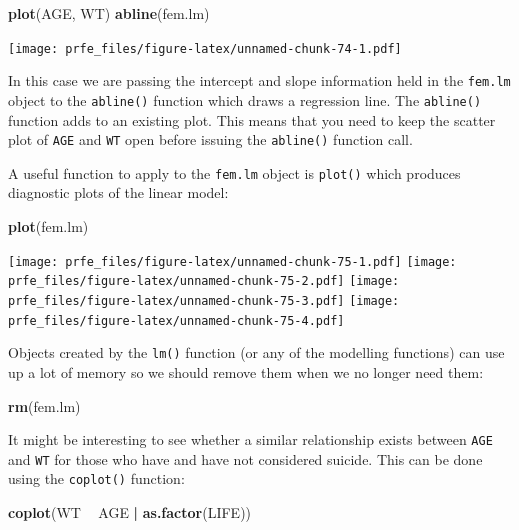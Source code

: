 \documentclass[12pt,]{book}
\newenvironment{Shaded}{\begin{snugshade}}{\end{snugshade}}
\newcommand{\KeywordTok}[1]{\textcolor[rgb]{0.13,0.29,0.53}{\textbf{#1}}}
\newcommand{\StringTok}[1]{\textcolor[rgb]{0.31,0.60,0.02}{#1}}
\newcommand{\OperatorTok}[1]{\textcolor[rgb]{0.81,0.36,0.00}{\textbf{#1}}}
\newcommand{\NormalTok}[1]{#1}
\theoremstyle{definition}
\theoremstyle{definition}
\theoremstyle{definition}
\theoremstyle{remark}
\begin{document}
\begin{Shaded}
\begin{Highlighting}[]
\KeywordTok{plot}\NormalTok{(AGE, WT)}
\KeywordTok{abline}\NormalTok{(fem.lm)}
\end{Highlighting}
\end{Shaded}

\texttt{[image: prfe\_files/figure-latex/unnamed-chunk-74-1.pdf]}

In this case we are passing the intercept and slope information held in
the \texttt{fem.lm} object to the \texttt{abline()} function which draws
a regression line. The \texttt{abline()} function adds to an existing
plot. This means that you need to keep the scatter plot of \texttt{AGE}
and \texttt{WT} open before issuing the \texttt{abline()} function call.

A useful function to apply to the \texttt{fem.lm} object is
\texttt{plot()} which produces diagnostic plots of the linear model:

\begin{Shaded}
\begin{Highlighting}[]
\KeywordTok{plot}\NormalTok{(fem.lm)}
\end{Highlighting}
\end{Shaded}

\texttt{[image: prfe\_files/figure-latex/unnamed-chunk-75-1.pdf]}
\texttt{[image: prfe\_files/figure-latex/unnamed-chunk-75-2.pdf]}
\texttt{[image: prfe\_files/figure-latex/unnamed-chunk-75-3.pdf]}
\texttt{[image: prfe\_files/figure-latex/unnamed-chunk-75-4.pdf]}

Objects created by the \texttt{lm()} function (or any of the modelling
functions) can use up a lot of memory so we should remove them when we
no longer need them:

\begin{Shaded}
\begin{Highlighting}[]
\KeywordTok{rm}\NormalTok{(fem.lm)}
\end{Highlighting}
\end{Shaded}

It might be interesting to see whether a similar relationship exists
between \texttt{AGE} and \texttt{WT} for those who have and have not
considered suicide. This can be done using the \texttt{coplot()}
function:

\begin{Shaded}
\begin{Highlighting}[]
\KeywordTok{coplot}\NormalTok{(WT }\OperatorTok{~}\StringTok{ }\NormalTok{AGE }\OperatorTok{|}\StringTok{ }\KeywordTok{as.factor}\NormalTok{(LIFE))}
\end{Highlighting}
\end{Shaded}
\end{document}
